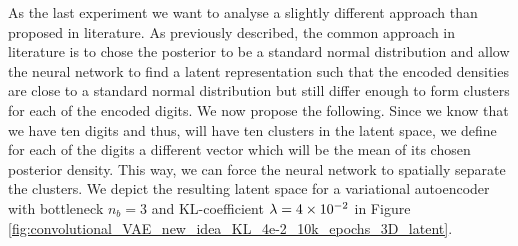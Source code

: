As the last experiment we want to analyse a slightly different approach than proposed in literature. As previously described, the common approach in literature is to chose the posterior to be a standard normal distribution and allow the neural network to find a latent representation such that the encoded densities are close to a standard normal distribution but still differ enough to form clusters for each of the encoded digits. We now propose the following. Since we know that we have ten digits and thus, will have ten clusters in the latent space, we define for each of the digits a different vector which will be the mean of its chosen posterior density. This way, we can force the neural network to spatially separate the clusters. We depict the resulting latent space for a variational autoencoder with bottleneck $n_b=3$ and KL-coefficient $\lambda=\num{4e-2}$ in Figure \ref{fig:convolutional_VAE_new_idea_KL_4e-2_10k_epochs_3D_latent}.

